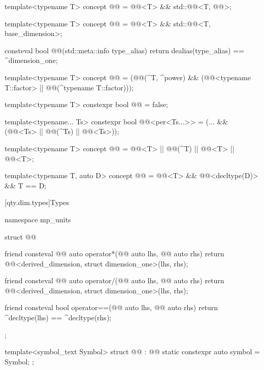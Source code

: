 \begin{itemdecl}
template<typename T>
concept @@ = @@<T> && std::@@<T, @@>;

template<typename T>
concept @@ = @@<T> && std::@@<T, base_dimension>;

consteval bool @@(std::meta::info type_alias) {
  return dealias(type_alias) == ^dimension_one;
}

template<typename T>
concept @@ =
  (@@(^T, ^power) &&
   (@@<typename T::factor> || @@(^typename T::factor)));

template<typename T>
constexpr bool @@ = false;

template<typename... Ts>
constexpr bool @@<per<Ts...>> =
  (... && (@@<Ts> || @@(^Ts) || @@<Ts>));

template<typename T>
concept @@ =
  @@<T> || @@(^T) || @@<T> || @@<T>;

template<typename T, auto D>
concept @@ = @@<T> && @@<decltype(D)> && T{} == D;
\end{itemdecl}

[qty.dim.types]{Types}

\begin{codeblock}
namespace mp_units {

struct @@ {
  friend consteval @@ auto operator*(@@ auto lhs, @@ auto rhs)
  {
    return @@<derived_dimension, struct dimension_one>(lhs, rhs);
  }

  friend consteval @@ auto operator/(@@ auto lhs, @@ auto rhs)
  {
    return @@<derived_dimension, struct dimension_one>(lhs, rhs);
  }

  friend consteval bool operator==(@@ auto lhs, @@ auto rhs)
  {
    return ^decltype(lhs) == ^decltype(rhs);
  }
};

template<symbol_text Symbol>
struct @@ : @@ {
  static constexpr auto symbol = Symbol;
};

}
\end{codeblock}

